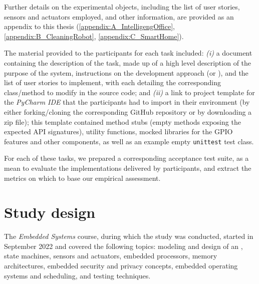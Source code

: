Further details on the experimental objects, including the list of user stories, sensors and actuators employed, and other information, are provided as an appendix to this thesis (\ref{appendix:A_IntelligengOffice}, \ref{appendix:B_CleaningRobot}, \ref{appendix:C_SmartHome}).

The material provided to the participants for each task included: \textit{(i)} a document containing the description of the task, made up of a high level description of the purpose of the system, instructions on the development approach (\ie \tdd or \notdd), and the list of user stories to implement, with each detailing the corresponding class/method to modify in the source code; and \textit{(ii)} a link to project template for the \textit{PyCharm IDE} that the participants had to import in their environment (\ie by either forking/cloning the corresponding GitHub repository or by downloading a zip file); this template contained method stubs (\ie empty methods exposing the expected API signatures), utility functions, mocked libraries for the GPIO features and other components, as well as an example empty \texttt{unittest} test class.

For each of these tasks, we prepared a corresponding acceptance test suite, as a mean to evaluate the implementations delivered by participants, and extract the metrics on which to base our empirical assessment.


\section{Study design}
The \textit{Embedded Systems} course, during which the study was conducted, started in September 2022 and covered the following topics: modeling and design of an \es, state machines, sensors and actuators, embedded processors, memory architectures, embedded security and privacy concepts, embedded operating systems and scheduling, and \ess testing techniques.

